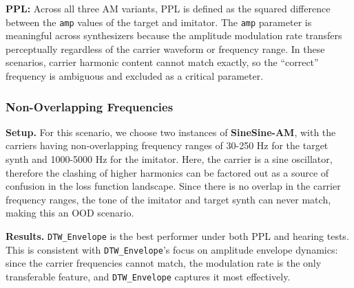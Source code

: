 \documentclass[10pt]{article} %
\newcommand{\DTWEnv}{\texttt{DTW\_\allowbreak Envelope}\xspace}
\newcommand{\FMModvtwo}{\textbf{SineSine-AM}\xspace}
\begin{document}
\noindent \textbf{PPL:} Across all three AM variants, PPL is defined as the squared difference between the \texttt{amp} values of the target and imitator. The \texttt{amp}  parameter is meaningful across synthesizers because the amplitude modulation rate transfers perceptually regardless of the carrier waveform or frequency range. In these scenarios, carrier harmonic content cannot match exactly, so the ``correct'' frequency is ambiguous and excluded as a critical parameter.




\subsubsection{Non-Overlapping Frequencies}
\label{sec:am_sound_matching_nonoverlapping}
\textbf{Setup.} For this scenario, we choose two instances of \FMModvtwo, with the carriers having non-overlapping frequency ranges of 30-250 Hz for the target synth and 1000-5000 Hz for the imitator. Here, the carrier is a sine oscillator, therefore the clashing of higher harmonics can be factored out as a source of confusion in the loss function landscape. Since there is no overlap in the carrier frequency ranges, the tone of the imitator and target synth can never match, making this an OOD scenario. 

\noindent \textbf{Results.}
\DTWEnv is the best performer under both PPL and hearing tests. This is consistent with \DTWEnv's focus on amplitude envelope dynamics: since the carrier frequencies cannot match, the modulation rate is the only transferable feature, and \DTWEnv captures it most effectively.
\end{document}
